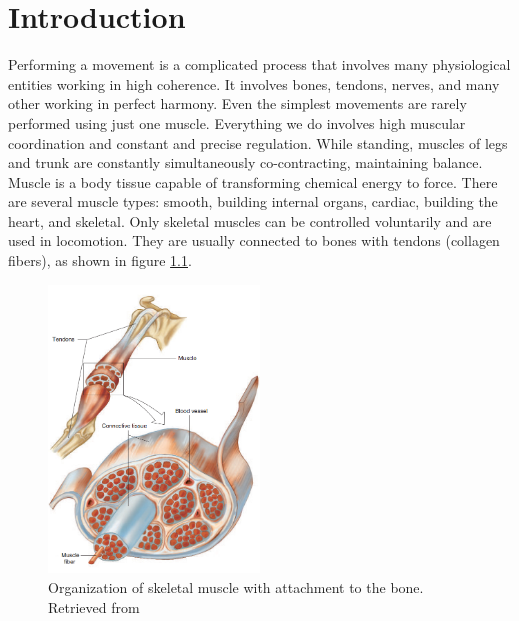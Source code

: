 

\chapter{Introduction}

Performing a movement is a complicated process that involves many physiological entities working in high coherence. It involves bones, tendons, nerves, and many other working in perfect harmony. Even the simplest movements are rarely performed using just one muscle. Everything we do involves high muscular coordination and constant and precise regulation. While standing, muscles of legs and trunk are constantly simultaneously co-contracting, maintaining balance.  
Muscle is a body tissue capable of transforming chemical energy to force. There are several muscle types: smooth, building internal organs, cardiac, building the heart, and skeletal. Only skeletal muscles can be controlled voluntarily and are used in locomotion. They are usually connected to bones with tendons (collagen fibers), as shown in figure \ref{fig:muscle}.
\begin{figure}[ht]
\centering
\includegraphics[width=0.5\textwidth]{Images/introduction/muscle.png}
\caption{Organization of skeletal muscle with attachment to the bone. Retrieved from \citep{Widmaier2014}}
\label{fig:muscle}
\end{figure}

